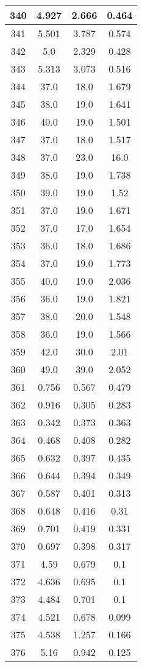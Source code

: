 \begin{table}[H]
\begin{tabular}{|c|c|c|c|}
\hline
340 & 4.927 & 2.666 & 0.464 \\
\hline
341 & 5.501 & 3.787 & 0.574 \\
\hline
342 & 5.0 & 2.329 & 0.428 \\
\hline
343 & 5.313 & 3.073 & 0.516 \\
\hline
344 & 37.0 & 18.0 & 1.679 \\
\hline
345 & 38.0 & 19.0 & 1.641 \\
\hline
346 & 40.0 & 19.0 & 1.501 \\
\hline
347 & 37.0 & 18.0 & 1.517 \\
\hline
348 & 37.0 & 23.0 & 16.0 \\
\hline
349 & 38.0 & 19.0 & 1.738 \\
\hline
350 & 39.0 & 19.0 & 1.52 \\
\hline
351 & 37.0 & 19.0 & 1.671 \\
\hline
352 & 37.0 & 17.0 & 1.654 \\
\hline
353 & 36.0 & 18.0 & 1.686 \\
\hline
354 & 37.0 & 19.0 & 1.773 \\
\hline
355 & 40.0 & 19.0 & 2.036 \\
\hline
356 & 36.0 & 19.0 & 1.821 \\
\hline
357 & 38.0 & 20.0 & 1.548 \\
\hline
358 & 36.0 & 19.0 & 1.566 \\
\hline
359 & 42.0 & 30.0 & 2.01 \\
\hline
360 & 49.0 & 39.0 & 2.052 \\
\hline
361 & 0.756 & 0.567 & 0.479 \\
\hline
362 & 0.916 & 0.305 & 0.283 \\
\hline
363 & 0.342 & 0.373 & 0.363 \\
\hline
364 & 0.468 & 0.408 & 0.282 \\
\hline
365 & 0.632 & 0.397 & 0.435 \\
\hline
366 & 0.644 & 0.394 & 0.349 \\
\hline
367 & 0.587 & 0.401 & 0.313 \\
\hline
368 & 0.648 & 0.416 & 0.31 \\
\hline
369 & 0.701 & 0.419 & 0.331 \\
\hline
370 & 0.697 & 0.398 & 0.317 \\
\hline
371 & 4.59 & 0.679 & 0.1 \\
\hline
372 & 4.636 & 0.695 & 0.1 \\
\hline
373 & 4.484 & 0.701 & 0.1 \\
\hline
374 & 4.521 & 0.678 & 0.099 \\
\hline
375 & 4.538 & 1.257 & 0.166 \\
\hline
376 & 5.16 & 0.942 & 0.125 \\
\hline
\end{tabular}
\end{table}
